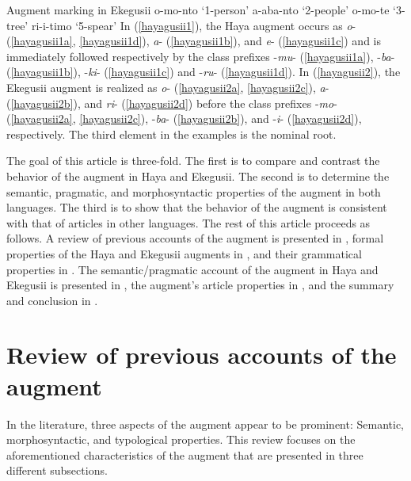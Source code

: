 \documentclass[output=paper]{langscibook}
\begin{document}
\ea Augment marking in Ekegusii\label{hayagusii2}
    \ea\label{hayagusii2a}  o-mo-nto\hphantom{`} 	‘1-person’
    \ex\label{hayagusii2b}   a-aba-nto\hphantom{`}	 ‘2-people’
    \ex\label{hayagusii2c}  o-mo-te\hphantom{ln}		‘3-tree’
    \ex\label{hayagusii2d}  ri-i-timo\hphantom{n}		‘5-spear’
    \z
\z
In (\ref{hayagusii1}), the Haya augment occurs as \textit{o}- (\ref{hayagusii1a}, \ref{hayagusii1d}), \textit{a}- (\ref{hayagusii1b}), and \textit{e}- (\ref{hayagusii1c}) and is immediately followed respectively by the class prefixes -\textit{mu}- (\ref{hayagusii1a}), -\textit{ba}- (\ref{hayagusii1b}), -\textit{ki}- (\ref{hayagusii1c}) and -\textit{ru}- (\ref{hayagusii1d}). In (\ref{hayagusii2}), the Ekegusii augment is realized as \textit{o}- (\ref{hayagusii2a}, \ref{hayagusii2c}), \textit{a}- (\ref{hayagusii2b}), and \textit{ri}- (\ref{hayagusii2d}) before the class prefixes -\textit{mo}- (\ref{hayagusii2a}, \ref{hayagusii2c}), -\textit{ba}- (\ref{hayagusii2b}), and -\textit{i}- (\ref{hayagusii2d}), respectively. The third element in the examples is the nominal root.

The goal of this article is three-fold. The first is to compare and contrast the behavior of the augment in Haya and Ekegusii. The second is to determine the semantic, pragmatic, and morphosyntactic properties of the augment in both languages. The third is to show that the behavior of the augment is consistent with that of articles in other languages. The rest of this article proceeds as follows. A review of previous accounts of the augment is presented in , formal properties of the Haya and Ekegusii augments in , and their grammatical properties in . The semantic/pragmatic account of the augment in Haya and Ekegusii is presented in , the augment’s article properties in , and the summary and conclusion in .

\section{Review of previous accounts of the augment}\label{sec:choti:2}
In the literature, three aspects of the augment appear to be prominent: Semantic, morphosyntactic, and typological properties. This review focuses on the aforementioned characteristics of the augment that are presented in three different subsections.
\end{document}
